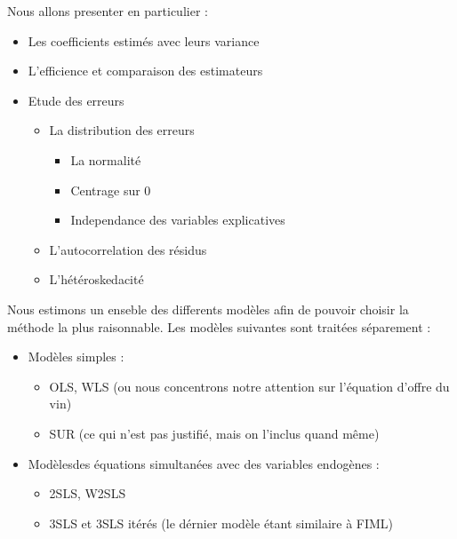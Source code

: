 \documentclass[11pt,]{article}
\providecommand{\tightlist}{%
  \setlength{\itemsep}{0pt}\setlength{\parskip}{0pt}}
\begin{document}
\par

Nous allons presenter en particulier :

\begin{itemize}
\tightlist
\item
  Les coefficients estimés avec leurs variance
\item
  L'efficience et comparaison des estimateurs
\item
  Etude des erreurs

  \begin{itemize}
  \tightlist
  \item
    La distribution des erreurs

    \begin{itemize}
    \tightlist
    \item
      La normalité
    \item
      Centrage sur 0
    \item
      Independance des variables explicatives
    \end{itemize}
  \item
    L'autocorrelation des résidus
  \item
    L'hétéroskedacité
  \end{itemize}
\end{itemize}

Nous estimons un enseble des differents modèles afin de pouvoir choisir
la méthode la plus raisonnable. Les modèles suivantes sont traitées
séparement :

\begin{itemize}
\tightlist
\item
  Modèles simples :

  \begin{itemize}
  \tightlist
  \item
    OLS, WLS (ou nous concentrons notre attention sur l'équation d'offre
    du vin)
  \item
    SUR (ce qui n'est pas justifié, mais on l'inclus quand même)
  \end{itemize}
\item
  Modèlesdes équations simultanées avec des variables endogènes :

  \begin{itemize}
  \tightlist
  \item
    2SLS, W2SLS
  \item
    3SLS et 3SLS itérés (le dérnier modèle étant similaire à FIML)
  \end{itemize}
\end{itemize}
\end{document}
